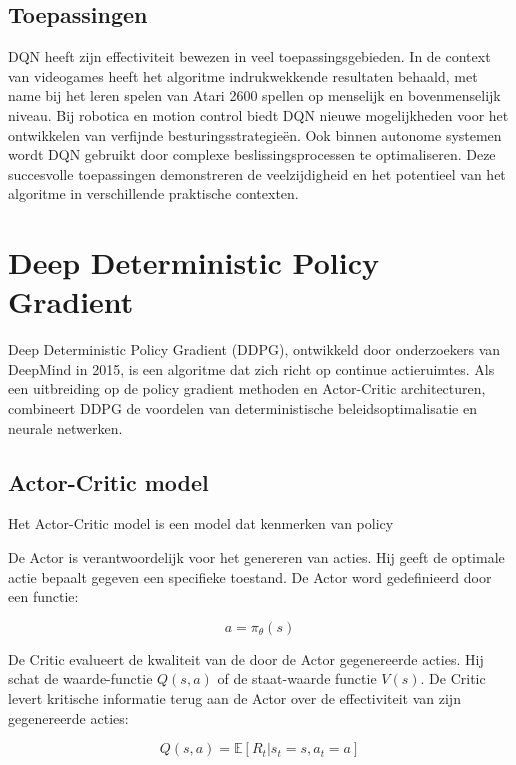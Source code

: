 \documentclass[a4paper,12pt]{report}
\begin{document}
\subsection{Toepassingen}
DQN heeft zijn effectiviteit bewezen in veel toepassingsgebieden. In de context
van videogames heeft het algoritme indrukwekkende resultaten behaald, met name
bij het leren spelen van Atari 2600 spellen op menselijk en bovenmenselijk
niveau. Bij robotica en motion control biedt DQN nieuwe mogelijkheden voor het
ontwikkelen van verfijnde besturingsstrategieën. Ook binnen autonome systemen
wordt DQN gebruikt door complexe beslissingsprocessen te optimaliseren. Deze
succesvolle toepassingen demonstreren de veelzijdigheid en het potentieel van
het algoritme in verschillende praktische contexten.

\section{Deep Deterministic Policy Gradient}
Deep Deterministic Policy Gradient (DDPG), ontwikkeld door onderzoekers van
DeepMind in 2015, is een algoritme dat zich richt op continue actieruimtes. Als
een uitbreiding op de policy gradient methoden en Actor-Critic architecturen,
combineert DDPG de voordelen van deterministische beleidsoptimalisatie en
neurale netwerken.

\subsection{Actor-Critic model}

Het Actor-Critic model is een model dat kenmerken van policy

De Actor is verantwoordelijk voor het genereren van acties. Hij geeft de
optimale actie bepaalt gegeven een specifieke toestand. De Actor word
gedefinieerd door een functie:

\begin{equation}
    a = \pi_\theta(s)
\end{equation}

De Critic evalueert de kwaliteit van de door de Actor gegenereerde acties. Hij
schat de waarde-functie $Q(s,a)$ of de staat-waarde functie $V(s)$. De Critic
levert kritische informatie terug aan de Actor over de effectiviteit van zijn
gegenereerde acties:

\begin{equation}
    Q(s,a) = \mathbb{E}[R_t | s_t = s, a_t = a]
\end{equation}
\end{document}

